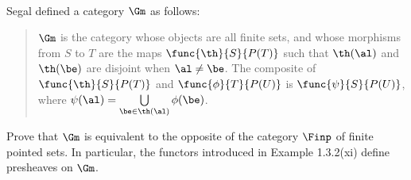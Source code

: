 \documentclass[main.tex]{subfiles}
\begin{document}
\paragraph{}
\begin{exercise}
	Segal defined a category \(\Gm\) as follows:
	\begin{quote}
		\(\Gm\) is the category whose objects are all finite sets, and whose
		morphisms from \(S\) to \(T\) are the maps \(\func{\th}{S}{P(T)}\) such
		that \(\th(\al)\) and \(\th(\be)\) are disjoint when \(\al\ne\be\). The
		composite of \(\func{\th}{S}{P(T)}\) and \(\func{\phi}{T}{P(U)}\) is
		\(\func{\psi}{S}{P(U)}\), where
		\(\psi(\al)=\bigcup\limits_{\be\in\th(\al)}\phi(\be)\).
	\end{quote}
	Prove that \(\Gm\) is equivalent to the opposite of the category \(\Finp\)
	of finite pointed sets. In particular, the functors introduced in Example
	1.3.2(xi) define presheaves on \(\Gm\).
\end{exercise}
\end{document}
